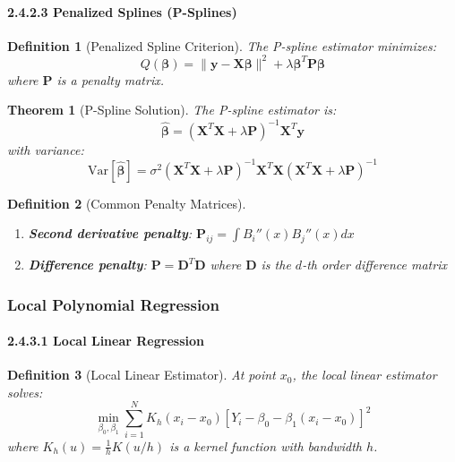 \documentclass{article}
\newtheorem{definition}{Definition}
\newtheorem{theorem}{Theorem}
\begin{document}
\paragraph{2.4.2.3 Penalized Splines (P-Splines)}

\begin{definition}[Penalized Spline Criterion]
The P-spline estimator minimizes:
\begin{equation}
Q(\boldsymbol{\beta}) = \|\mathbf{y} - \mathbf{X}\boldsymbol{\beta}\|^2 + \lambda \boldsymbol{\beta}^T\mathbf{P}\boldsymbol{\beta}
\end{equation}
where $\mathbf{P}$ is a penalty matrix.
\end{definition}

\begin{theorem}[P-Spline Solution]
The P-spline estimator is:
\begin{equation}
\hat{\boldsymbol{\beta}} = (\mathbf{X}^T\mathbf{X} + \lambda\mathbf{P})^{-1}\mathbf{X}^T\mathbf{y}
\end{equation}
with variance:
\begin{equation}
\text{Var}[\hat{\boldsymbol{\beta}}] = \sigma^2(\mathbf{X}^T\mathbf{X} + \lambda\mathbf{P})^{-1}\mathbf{X}^T\mathbf{X}(\mathbf{X}^T\mathbf{X} + \lambda\mathbf{P})^{-1}
\end{equation}
\end{theorem}

\begin{definition}[Common Penalty Matrices]
\begin{enumerate}
    \item \textbf{Second derivative penalty}: $\mathbf{P}_{ij} = \int B_i''(x)B_j''(x)dx$
    \item \textbf{Difference penalty}: $\mathbf{P} = \mathbf{D}^T\mathbf{D}$ where $\mathbf{D}$ is the $d$-th order difference matrix
\end{enumerate}
\end{definition}

\subsubsection{Local Polynomial Regression}

\paragraph{2.4.3.1 Local Linear Regression}

\begin{definition}[Local Linear Estimator]
At point $x_0$, the local linear estimator solves:
\begin{equation}
\min_{\beta_0, \beta_1} \sum_{i=1}^N K_h(x_i - x_0)[Y_i - \beta_0 - \beta_1(x_i - x_0)]^2
\end{equation}
where $K_h(u) = \frac{1}{h}K(u/h)$ is a kernel function with bandwidth $h$.
\end{definition}
\end{document}

